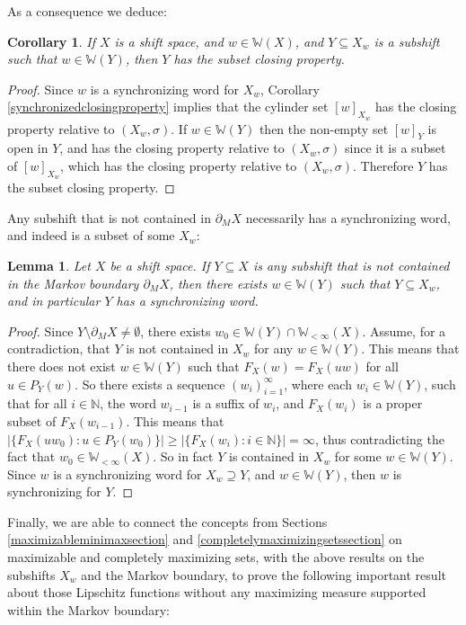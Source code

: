 \documentclass[reqno,11pt]{amsart}
\newtheorem{lem}[thm]{Lemma}
\newtheorem{cor}[thm]{Corollary}
\theoremstyle{definition}
\theoremstyle{remark}
\theoremstyle{remark}
\def\w{\mathbb{W}}
\numberwithin{equation}{section}
\begin{document}
As a consequence we deduce:

\begin{cor}\label{l-s-a}
If $X$ is a shift space, and $w\in\w(X)$, and $Y\subseteq X_w$ 
is a subshift such that $w\in\w(Y)$,
then $Y$ has the subset closing property. 
\end{cor}
\begin{proof}
Since $w$ is a synchronizing word for $X_w$, 
Corollary \ref{synchronizedclosingproperty} implies that
the cylinder set $[w]_{X_w}$ has the closing property relative to $(X_w,\sigma)$.
If $w\in\w(Y)$ then the non-empty set $[w]_Y$ is open in $Y$, and has the closing property relative to $(X_w,\sigma)$
since it is a subset of $[w]_{X_w}$, which has the closing property relative to $(X_w,\sigma)$.
Therefore $Y$ has the subset closing property.
\end{proof}





Any subshift that is not contained in $\partial_M X$ necessarily has a synchronizing word, and indeed is a subset of some $X_w$: 

\begin{lem}\label{l-1} Let $X$ be a shift space. If $Y\subseteq X$ is any subshift that is not contained in the Markov
boundary $\partial_M X$, then 
there exists $w\in\w(Y)$
such that
$
Y \subseteq X_w
$,
and in particular $Y$ has a synchronizing word.
\end{lem}
\begin{proof}Since $Y\setminus \partial_MX\neq\emptyset$, 
there exists  $w_0\in \mathbb{W}(Y)\cap \mathbb{W}_{<\infty}(X)$.
	Assume, for a contradiction, that $Y$ is not 
contained in $X_w$
for any $w\in\w(Y)$.
This means that there does not exist $w\in \mathbb{W}(Y)$ such that $F_X(w)=F_X(uw)$
	for all 
$ u\in P_Y(w)$.
So there exists a sequence
$(w_i)_{i=1}^\infty$, where each $w_i\in \w(Y)$, such that
for all $i\in \mathbb{N}$,
the word $w_{i-1}$ is a suffix of $w_{i}$,
and 
	  $F_X(w_{i})$ is a proper subset of $F_X(w_{i-1})$.
This means that 
	 $ |\{F_X(uw_0): u\in P_Y(w_0)\}|\ge  |\{F_X(w_i): i\in\mathbb{N}\}|=\infty$, 
thus contradicting the fact that $w_0\in \mathbb{W}_{<\infty}(X)$. 
So in fact $Y$ is 
contained in $X_w$
for some $w\in\w(Y)$.
Since $w$ is a synchronizing word for $X_w\supseteq Y$, and 
$w\in\w(Y)$, then $w$ is synchronizing for $Y$.
	\end{proof}

Finally, we are able to connect the concepts from Sections \ref{maximizableminimaxsection} and  \ref{completelymaximizingsetssection} on maximizable and completely maximizing sets,
with the
above results on the subshifts $X_w$ and the Markov boundary,
to prove the following important result
about those Lipschitz functions without any maximizing measure supported within the Markov boundary:
\end{document}
